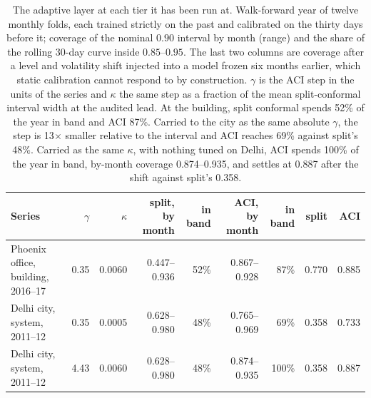 \begin{table}[t]
\centering
\scriptsize
\setlength{\tabcolsep}{3pt}
\begin{tabular}{lrrrrrrrr}
\toprule
Series & $\gamma$ & $\kappa$ & split, by month & in band & ACI, by month & in band & split & ACI \\
\midrule
Phoenix office, building, 2016--17 & 0.35 & 0.0060 & 0.447--0.936 & 52\% & 0.867--0.928 & 87\% & 0.770 & 0.885 \\
Delhi city, system, 2011--12 & 0.35 & 0.0005 & 0.628--0.980 & 48\% & 0.765--0.969 & 69\% & 0.358 & 0.733 \\
Delhi city, system, 2011--12 & 4.43 & 0.0060 & 0.628--0.980 & 48\% & 0.874--0.935 & 100\% & 0.358 & 0.887 \\
\bottomrule
\end{tabular}
\caption{The adaptive layer at each tier it has been run at. Walk-forward year of twelve monthly folds, each trained strictly on the past and calibrated on the thirty days before it; coverage of the nominal $0.90$ interval by month (range) and the share of the rolling 30-day curve inside $0.85$--$0.95$. The last two columns are coverage after a level and volatility shift injected into a model frozen six months earlier, which static calibration cannot respond to by construction. $\gamma$ is the ACI step in the units of the series and $\kappa$ the same step as a fraction of the mean split-conformal interval width at the audited lead. At the building, split conformal spends 52\% of the year in band and ACI 87\%. Carried to the city as the same absolute $\gamma$, the step is 13$\times$ smaller relative to the interval and ACI reaches 69\% against split's 48\%. Carried as the same $\kappa$, with nothing tuned on Delhi, ACI spends 100\% of the year in band, by-month coverage 0.874--0.935, and settles at 0.887 after the shift against split's 0.358.}
\label{tab:aci}
\end{table}
